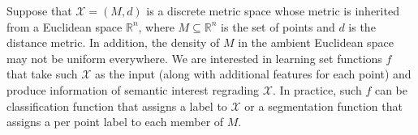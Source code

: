 Suppose that $\mathcal{X}=(M, d)$ is a discrete metric space whose metric is inherited from a Euclidean space $\mathbb{R}^n$, where $M\subseteq \mathbb{R}^n$ is the set of points and $d$ is the distance metric. In addition, the density of $M$ in the ambient Euclidean space may not be uniform everywhere. We are interested in learning set functions $f$ that take such $\mathcal{X}$ as the input (along with additional features for each point) and produce information of semantic interest regrading $\mathcal{X}$. In practice, such $f$ can be classification function that assigns a label to $\mathcal{X}$ or a segmentation function that assigns a per point label to each member of $M$.

